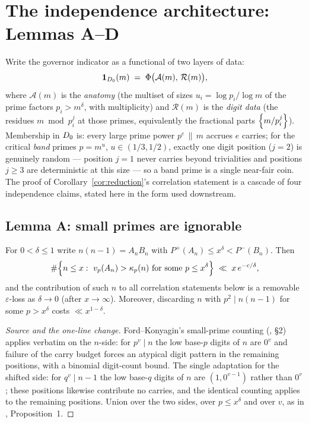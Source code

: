 \section{The independence architecture: Lemmas A--D}\label{sec:architecture}

Write the governor indicator as a functional of two layers of data:
\[
\mathbf 1_{D_0}(m)\;=\;\Phi\big(\mathcal A(m),\,\mathcal R(m)\big),
\]
where $\mathcal A(m)$ is the \emph{anatomy} (the multiset of sizes
$u_i=\log p_i/\log m$ of the prime factors $p_i>m^{\delta}$, with
multiplicity) and $\mathcal R(m)$ is the \emph{digit data} (the residues
$m\bmod p_i^{j}$ at those primes, equivalently the fractional parts
$\left\{m/p_i^j\right\}$). Membership in $D_0$ is: every large prime power
$p^e\,\|\,m$ accrues $e$ carries; for the critical \emph{band} primes
$p=m^{u}$, $u\in(1/3,1/2)$, exactly one digit position ($j=2$) is
genuinely random --- position $j=1$ never carries beyond trivialities and
positions $j\ge3$ are deterministic at this size --- so a band prime is a
single near-fair coin. The proof of
Corollary~\ref{cor:reduction}'s correlation statement is a cascade of four
independence claims, stated here in the form used downstream.

\subsection{Lemma A: small primes are ignorable}

\begin{lemma}[A]\label{lem:A}
\statusKA\quad
For $0<\delta\le1$ write $n(n-1)=A_nB_n$ with
$P^+(A_n)\le x^{\delta}<P^-(B_n)$. Then
\[
\#\Big\{n\le x:\ v_p(A_n)>\ka_p(n)\ \text{for some }p\le x^\delta\Big\}
\;\ll\; x\,e^{-c/\delta},
\]
and the contribution of such $n$ to all correlation statements below is a
removable $\varepsilon$-loss as $\delta\to0$ (after $x\to\infty$).
Moreover, discarding $n$ with $p^2\mid n(n-1)$ for some $p>x^\delta$ costs
$\ll x^{1-\delta}$.
\end{lemma}

\begin{proof}[Source and the one-line change]
Ford--Konyagin's small-prime counting (\cite{FK21}, \S2) applies verbatim
on the $n$-side: for $p^v\mid n$ the low base-$p$ digits of $n$ are $0^v$
and failure of the carry budget forces an atypical digit pattern in the
remaining positions, with a binomial digit-count bound. The single
adaptation for the shifted side: for $q^v\mid n-1$ the low base-$q$ digits
of $n$ are $(1,0^{v-1})$ rather than $0^v$; these positions likewise
contribute no carries, and the identical counting applies to the remaining
positions. Union over the two sides, over $p\le x^\delta$ and over $v$, as
in \cite{FK21}, Proposition~1.
\end{proof}

